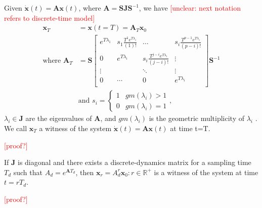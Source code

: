 \documentclass[sigconf]{llncs}
\newcommand{\mat}[1]{\boldsymbol{#1}}
\renewcommand{\vec}[1]{\boldsymbol{#1}}
\renewcommand{\note}[1]{\textcolor{red}{[#1]}}
\begin{document}
 \begin{theorem}
 Given $\dot{\vec{x}}(t)=\mat{A}\vec{x}(t)$, where $\mat{A}=\mat{S}\mat{J}\mat{S}^{-1}$, we have
\note{unclear: next notation refers to discrete-time model}
 \begin{align}
 \vec{x}_T&=\vec{x}(t=T)=\mat{A}_{T}\vec{x}_0\\
 \text{where }\mat{A}_{T}&= \mat{S}
 \left [ \begin{array}{cccc}
 e^{T\lambda_1}  & s_1\frac{T^{1}e^{T\lambda_i}}{(1)!} & \hdots  & s_i\frac{T^{p-1}e^{T\lambda_i}}{(p-i)!} \\
0 & e^{T\lambda_i}  & s_i\frac{T^{j-i}e^{T\lambda_i}}{(j-i)!} & \vdots \\
\vdots & & \ddots & \vdots \\
0 & \cdots & 0  &e^{T\lambda_i} \\
\end{array} \right ]
 \mat{S}^{-1}
 \label{eq:continuous_tube_dyn}\\
 &\text{and } s_i=\left\{\begin{array}{cc}1&gm(\lambda_i)>1\\0&gm(\lambda_i)=1\end{array}\right.,\nonumber
 \end{align}
$\lambda_i \in \mat{J}$ are the eigenvalues of $\mat{A}$, and $gm(\lambda_i)$ is the geometric multiplicity of $\lambda_i$ \cite{Astrom08}.  
We call $\vec{x}_T$ a witness of the system $\dot{\vec{x}}(t)=\mat{A}\vec{x}(t)$ at time t=T.
 \end{theorem}
 \note{proof?}  
 \begin{corollary}
 If $\mat{J}$ is diagonal and there exists a discrete-dynamics matrix for a sampling time $T_d$ such that $A_d=e^{\mat{A} T_d}$, then $\vec{x}_r=A_d^r\vec{x}_0 : r \in \mathbb{R}^+$ is a witness of the system at time $t=rT_d$.
 \end{corollary}
  \note{proof?} 
%
\end{document}

